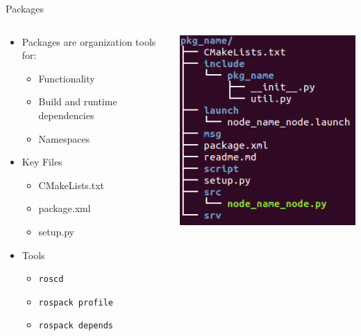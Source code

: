 \documentclass[aspectratio=43]{beamer}
\begin{document}
\begin{frame}{Packages}
	\begin{columns}
		\begin{column}{0.6\textwidth}
			\begin{itemize}
				\item Packages are organization tools for:
				\begin{itemize}
					\item Functionality
					\item Build and runtime dependencies
					\item Namespaces
				\end{itemize}
				\item Key Files
				\begin{itemize}
					\item CMakeLists.txt
					\item package.xml
					\item setup.py
				\end{itemize}
				\item Tools
				\begin{itemize}
					\item \texttt{roscd}
					\item \texttt{rospack profile}
					\item \texttt{rospack depends}
				\end{itemize}
			\end{itemize}
		\end{column}
		\begin{column}{0.4\textwidth}
			\centering
			\includegraphics[width=\textwidth]{fig/pkg_tree.png}
		\end{column}
	\end{columns}
\end{frame}
\end{document}
